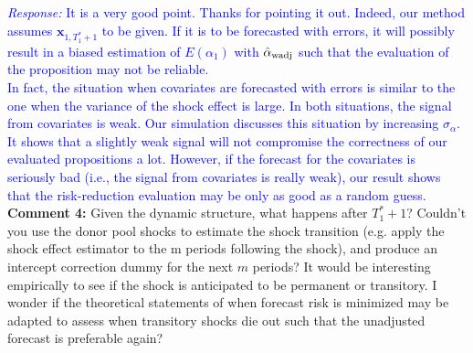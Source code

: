 \documentclass[12pt]{article}
\newcommand{\response}[1]{\noindent \textcolor{blue}{\emph{Response:} #1}}
\begin{document}
\response{It is a very good point. Thanks for pointing it out. Indeed, our method assumes $\mathbf{x}_{1, T_1^* + 1}$ to be given. If it is to be forecasted with errors, it will possibly result in a biased estimation of $E(\alpha_1)$ with $\hat{\alpha}_{\rm wadj}$ such that the evaluation of the proposition may not be reliable. \\

In fact, the situation when  covariates are forecasted with errors is similar to the one when the variance of the shock effect is large. In both situations, the signal from covariates is weak. Our simulation discusses this situation by increasing $\sigma_{\alpha}$. It shows that a slightly weak signal will not compromise the correctness of our evaluated propositions a lot. However, if the forecast for the covariates is seriously bad (i.e., the signal from covariates is really weak), our result shows that the risk-reduction evaluation may be only as good as a random guess.} \\

{\bf Comment 4:} Given the dynamic structure, what happens after $T_1^*+1$? Couldn't you use the donor pool shocks to estimate the shock transition (e.g. apply the shock effect estimator to the m periods following the shock), and produce an intercept correction dummy for the next $m$ periods? It would be interesting empirically to see if the shock is anticipated to be permanent or transitory. I wonder if the theoretical statements of when forecast risk is minimized may be adapted to assess when transitory shocks die out such that the unadjusted forecast is preferable again? \\
\end{document}

